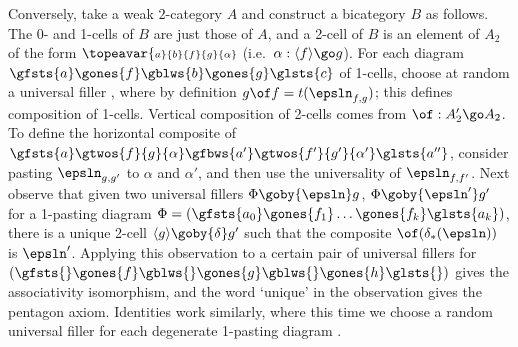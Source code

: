 Conversely, take a weak $2$-category $A$ and construct a bicategory $B$ as
follows.  The 0- and 1-cells of $B$ are just those of $A$, and a 2-cell of
$B$ is an element of $A_2$ of the form $\topeavar{\scriptstyle
a}{\scriptstyle b}{\scriptstyle f}{\scriptstyle g}{\scriptstyle \alpha}$
(i.e.\ $\alpha: \langle f \rangle \go g$).  For each diagram $\gfsts{a}
\gones{f} \gblws{b} \gones{g} \glsts{c}$ of 1-cells, choose at random a
universal filler
%
,
%
where by definition $g\of f = t(\epsln_{f,g})$; this defines composition of
1-cells.  Vertical composition of 2-cells comes from $\of: A'_2 \go A_2$.  To
define the horizontal composite of $\gfsts{a} \gtwos{f}{g}{\alpha} \gfbws{a'}
\gtwos{f'}{g'}{\alpha'} \glsts{a''}$, consider pasting $\epsln_{g,g'}$ to
$\alpha$ and $\alpha'$, and then use the universality of $\epsln_{f,f'}$.
Next observe that given two universal fillers $\Phi \goby{\epsln} g$, $\Phi
\goby{\epsln'} g'$ for a 1-pasting diagram $\Phi = (\gfsts{a_0} \gones{f_1}
\ldots \gones{f_k} \glsts{a_k})$, there is a unique 2-cell $\langle g \rangle
\goby{\delta} g'$ such that the composite $\of (\delta_* (\epsln))$ is
$\epsln'$.  Applying this observation to a certain pair of universal fillers
for $(\gfsts{} \gones{f} \gblws{} \gones{g} \gblws{} \gones{h} \glsts{})$
gives the associativity isomorphism, and the word `unique' in the observation
gives the pentagon axiom.  Identities work similarly, where this time we
choose a random universal filler for each degenerate 1-pasting diagram
.

 






